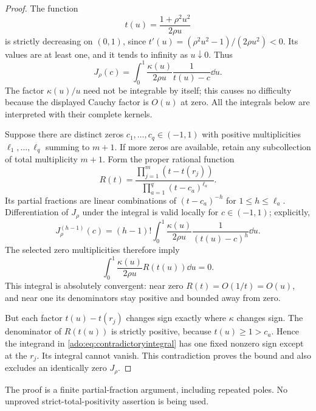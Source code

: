 \begin{proof}
The function
\begin{equation}\label{ado:eq:cauchymap}
 t(u)=\frac{1+\rho^2u^2}{2\rho u}
\end{equation}
is strictly decreasing on $(0,1)$, since
$t'(u)=(\rho^2u^2-1)/(2\rho u^2)<0$. Its values are at least one,
and it tends to infinity as $u\downarrow0$. Thus
\[
 J_\rho(c)=\int_0^1\frac{\kappa(u)}{2\rho u}
                         \frac1{t(u)-c}\dd u.
\]
The factor $\kappa(u)/u$ need not be integrable by itself; this causes
no difficulty because the displayed Cauchy factor is $O(u)$ at zero.
All the integrals below are interpreted with their complete kernels.

Suppose there are distinct zeros $c_1,\ldots,c_q\in(-1,1)$ with
positive multiplicities $\ell_1,\ldots,\ell_q$ summing to $m+1$.
If more zeros are available, retain any subcollection of total
multiplicity $m+1$. Form the proper rational function
\begin{equation}\label{ado:eq:variationrational}
 R(t)=\frac{\prod_{j=1}^m(t-t(r_j))}
             {\prod_{a=1}^q(t-c_a)^{\ell_a}}.
\end{equation}
Its partial fractions are linear combinations of
$(t-c_a)^{-h}$ for $1\le h\le\ell_a$. Differentiation of $J_\rho$
under the integral is valid locally for $c\in(-1,1)$; explicitly,
\[
 J_\rho^{(h-1)}(c)
 =(h-1)!\int_0^1\frac{\kappa(u)}{2\rho u}
                         \frac1{(t(u)-c)^h}\dd u.
\]
The selected zero multiplicities therefore imply
\begin{equation}\label{ado:eq:contradictoryintegral}
 \int_0^1\frac{\kappa(u)}{2\rho u}R(t(u))\dd u=0.
\end{equation}
This integral is absolutely convergent: near zero $R(t)=O(1/t)=O(u)$,
and near one its denominators stay positive and bounded away from zero.

But each factor $t(u)-t(r_j)$ changes sign exactly where $\kappa$
changes sign. The denominator of $R(t(u))$ is strictly positive, because
$t(u)\ge1>c_a$. Hence the integrand in
\eqref{ado:eq:contradictoryintegral} has one fixed nonzero sign except
at the $r_j$. Its integral cannot vanish. This contradiction proves the
bound and also excludes an identically zero $J_\rho$.
\end{proof}
The proof is a finite partial-fraction argument, including repeated poles.
No unproved strict-total-positivity assertion is being used.

